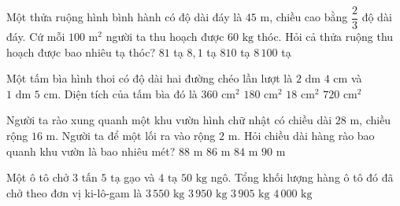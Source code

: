 \begin{ex} %
Một thửa ruộng hình bình hành có độ dài đáy là $45\text{ m}$, chiều cao bằng $\dfrac{2}{3}$ độ dài đáy. Cứ mỗi $100\text{ m}^2$ người ta thu hoạch được $60\text{ kg}$ thóc. Hỏi cả thửa ruộng thu hoạch được bao nhiêu tạ thóc?
\choice
{$81$ tạ}
{\True $8{,}1$ tạ}
{$810$ tạ}
{$8\,100$ tạ}
\end{ex}

\begin{ex} %
Một tấm bìa hình thoi có độ dài hai đường chéo lần lượt là $2\text{ dm } 4\text{ cm}$ và $1\text{ dm } 5\text{ cm}$. Diện tích của tấm bìa đó là
\choice
{$360\text{ cm}^2$}
{\True $180\text{ cm}^2$}
{$18\text{ cm}^2$}
{$720\text{ cm}^2$}
\end{ex}

\begin{ex} %
Người ta rào xung quanh một khu vườn hình chữ nhật có chiều dài $28\text{ m}$, chiều rộng $16\text{ m}$. Người ta để một lối ra vào rộng $2\text{ m}$. Hỏi chiều dài hàng rào bao quanh khu vườn là bao nhiêu mét?
\choice
{$88\text{ m}$}
{\True $86\text{ m}$}
{$84\text{ m}$}
{$90\text{ m}$}
\end{ex}

\begin{ex} %
Một ô tô chở $3\text{ tấn } 5\text{ tạ}$ gạo và $4\text{ tạ } 50\text{ kg}$ ngô. Tổng khối lượng hàng ô tô đó đã chở theo đơn vị ki-lô-gam là
\choice
{$3\,550\text{ kg}$}
{\True $3\,950\text{ kg}$}
{$3\,905\text{ kg}$}
{$4\,000\text{ kg}$}
\end{ex}

